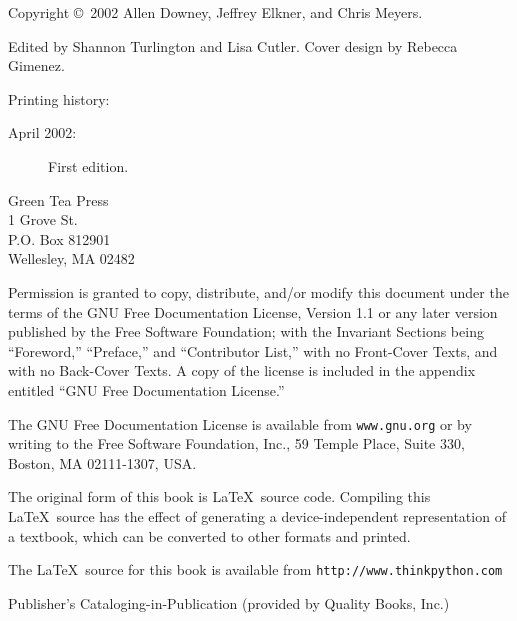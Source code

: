 \documentclass[b5paper,10pt]{book}
\begin{document}
{\small
Copyright \copyright ~2002 Allen Downey, Jeffrey Elkner, and Chris Meyers.

Edited by Shannon Turlington and Lisa Cutler.  Cover design by Rebecca Gimenez.

Printing history:

\begin{description}

\item[April 2002:] First edition.

\end{description}

\vspace{0.2in}

\begin{flushleft}
Green Tea Press       \\
1 Grove St.           \\
P.O. Box 812901       \\
Wellesley, MA 02482   \\
\end{flushleft}

Permission is granted to copy, distribute, and/or modify this document
under the terms of the GNU Free Documentation License, Version 1.1 or
any later version published by the Free Software Foundation; with the
Invariant Sections being ``Foreword,'' ``Preface,'' and ``Contributor
List,'' with no Front-Cover Texts, and with no Back-Cover Texts. A
copy of the license is included in the appendix entitled ``GNU Free
Documentation License.''

The GNU Free Documentation License is available from {\tt www.gnu.org}
or by writing to the Free Software Foundation, Inc., 59 Temple Place,
Suite 330, Boston, MA 02111-1307, USA.

The original form of this book is \LaTeX\ source code.  Compiling this
\LaTeX\ source has the effect of generating a device-independent
representation of a textbook, which can be converted to other formats
and printed.

The \LaTeX\ source for this book is available from
{\tt http://www.thinkpython.com}

\vspace{0.2in}

Publisher's Cataloging-in-Publication (provided by Quality Books, Inc.)

}
\end{document}
